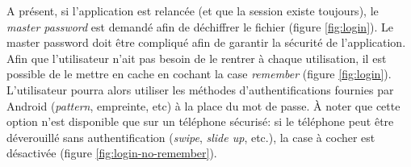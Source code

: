 \begin{center}
	\begin{minipage}{.3\textwidth}
	\end{minipage}
	\begin{minipage}{.3\textwidth}
	\end{minipage}
	\begin{minipage}{.3\textwidth}
	\end{minipage}        
\end{center}

A présent, si l'application est relancée (et que la session existe toujours), le \emph{master password} est demandé afin de déchiffrer le fichier (figure \ref{fig:login}). Le master password doit être compliqué afin de garantir la sécurité de l'application. Afin que l'utilisateur n'ait pas besoin de le rentrer à chaque utilisation, il est possible de le mettre en cache en cochant la case \emph{remember} (figure \ref{fig:login}). L'utilisateur pourra alors utiliser les méthodes d'authentifications fournies par Android (\emph{pattern}, empreinte, etc) à la place du mot de passe. À noter que cette option n'est disponible que sur un téléphone sécurisé: si le téléphone peut être déverouillé sans authentification (\emph{swipe}, \emph{slide up}, etc.), la case à cocher est désactivée (figure \ref{fig:login-no-remember}).

\begin{center}
	\begin{minipage}{.3\textwidth}
	\end{minipage}
	\begin{minipage}{.3\textwidth}
    \end{minipage}  
    \begin{minipage}{.3\textwidth}
	\end{minipage}        
\end{center}

